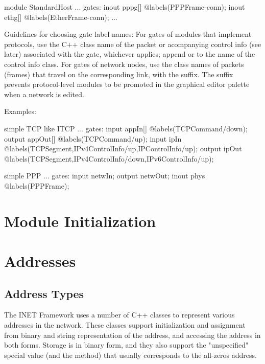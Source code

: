 \begin{ned}
module StandardHost
{
    ...
    gates:
        inout pppg[] @labels(PPPFrame-conn);
        inout ethg[] @labels(EtherFrame-conn);
    ...
}
\end{ned}

Guidelines for choosing gate label names: For gates of modules that
implement protocols, use the C++ class name of the packet or acompanying
control info (see later) associated with the gate, whichever applies;
append  or  to the name of the control info class. For
gates of network nodes, use the class names of packets (frames) that travel
on the corresponding link, with the  suffix. The suffix prevents
protocol-level modules to be promoted in the graphical editor palette when
a network is edited.

Examples:

\begin{ned}
simple TCP like ITCP
{
    ...
    gates:
        input appIn[] @labels(TCPCommand/down);
        output appOut[] @labels(TCPCommand/up);
        input ipIn @labels(TCPSegment,IPv4ControlInfo/up,IPControlInfo/up);
        output ipOut @labels(TCPSegment,IPv4ControlInfo/down,IPv6ControlInfo/up);
}
\end{ned}


\begin{ned}
simple PPP
{
    ...
    gates:
        input netwIn;
        output netwOut;
        inout phys @labels(PPPFrame);
}
\end{ned}
\fi

\section{Module Initialization}




\section{Addresses}

\subsection{Address Types}

The INET Framework uses a number of C++ classes to represent various
addresses in the network. These classes support initialization and
assignment from binary and string representation of the address, and
accessing the address in both forms. Storage is in binary form, and they also
support the "unspecified" special value (and the 
method) that usually corresponds to the all-zeros address.

